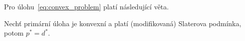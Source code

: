 \noindent Pro úlohu~\ref{eq:convex_problem} platí následující věta.
\begin{vt2}[Slaterova]
    Nechť primární úloha je konvexní a platí (modifikovaná) Slaterova podmínka, potom $p^* = d^*$.
\end{vt2}



